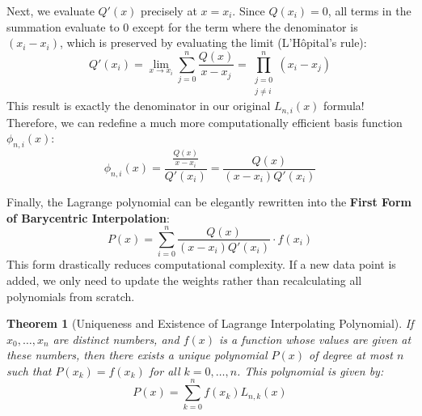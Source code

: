 \documentclass[12pt, a4paper]{article}
\theoremstyle{break}
\newtheorem{theorem}{Theorem}[section]
\begin{document}
Next, we evaluate $Q'(x)$ precisely at $x = x_i$.
Since $Q(x_i) = 0$, all terms in the summation evaluate to $0$ except for the term where the denominator is $(x_i - x_i)$, which is preserved by evaluating the limit (L'Hôpital's rule):
\[
Q'(x_i) = \lim_{x \to x_i} \sum_{j=0}^{n} \frac{Q(x)}{x - x_j} = \prod_{\substack{j=0 \\ j \neq i}}^{n} (x_i - x_j)
\]
This result is exactly the denominator in our original $L_{n,i}(x)$ formula!
Therefore, we can redefine a much more computationally efficient basis function $\phi_{n,i}(x)$:
\[
\phi_{n,i}(x) = \frac{\frac{Q(x)}{x-x_i}}{Q'(x_i)} = \frac{Q(x)}{(x-x_i)Q'(x_i)}
\]

Finally, the Lagrange polynomial can be elegantly rewritten into the \textbf{First Form of Barycentric Interpolation}:
\[
P(x) = \sum_{i=0}^{n} \frac{Q(x)}{(x-x_i)Q'(x_i)} \cdot f(x_i)
\]
This form drastically reduces computational complexity.
If a new data point is added, we only need to update the weights rather than recalculating all polynomials from scratch.

\begin{theorem}[Uniqueness and Existence of Lagrange Interpolating Polynomial]
If $x_0, \dots, x_n$ are distinct numbers, and $f(x)$ is a function whose values are given at these numbers, then there exists a unique polynomial $P(x)$ of degree at most $n$ such that $P(x_k) = f(x_k)$ for all $k = 0, \dots, n$. This polynomial is given by:
\[ P(x) = \sum_{k=0}^{n} f(x_k) L_{n,k}(x) \]
\end{theorem}
\end{document}
